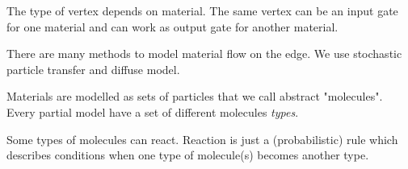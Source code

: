 \documentclass[11pt,a4paper]{article}
\begin{document}
The type of vertex depends on material. The same vertex can be an input gate for one material and can work as output gate for another  material.

There are many methods to model material flow on the edge.  We use stochastic particle transfer and diffuse model.

Materials are modelled as sets of particles that we call abstract "molecules". Every partial model have a set of different molecules \textit{types}. 

Some types of molecules can react. Reaction is just a (probabilistic) rule which describes conditions when one type of molecule(s) becomes another type.  

    

 
\end{document}
